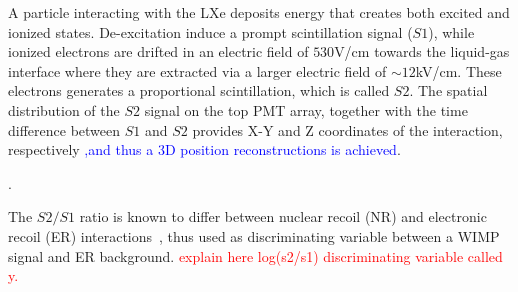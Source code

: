 A particle interacting with the LXe deposits energy that creates both excited and ionized states. De-excitation  induce a prompt scintillation signal ($S1$), while 
ionized electrons are drifted in an electric field of $530$V/cm towards the liquid-gas interface where they are extracted via a larger electric field of $\sim12$kV/cm. 
These electrons generates a proportional scintillation, which is called $S2$. The spatial distribution of the $S2$ signal on the top PMT array, together with the time difference between $S1$ and $S2$ provides X-Y and Z coordinates of the interaction, respectively \textcolor{blue}{,and thus a 3D position reconstructions is achieved}. 

.

The $S2/S1$ ratio is known to differ between nuclear recoil (NR) and electronic recoil (ER) interactions~\cite{}, thus used as  discriminating variable between a WIMP signal and ER background.
\textcolor{red}{explain here log(s2/s1) discriminating variable called y.} %

      
